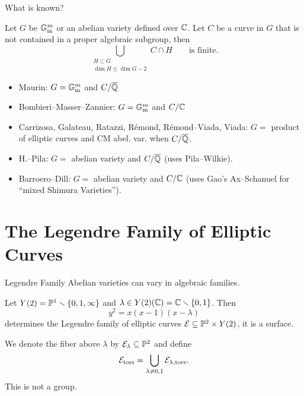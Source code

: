 \documentclass{beamer}
\begin{document}
\begin{frame}{What is known?}
  \begin{theorem}
    Let $G$ be ${\mathbb{G}}_\mathrm{m}^m$ or an abelian variety defined over
    ${\mathbb{C}}$. Let $C$ be a curve in $G$ that is not contained in a proper
    algebraic subgroup, then
    \begin{equation*}
      \bigcup_{\substack{H\subset G \\\dim H\le \dim G-2}} C\cap H
      \qquad\text{is finite.}
    \end{equation*}
  \end{theorem}
  \begin{itemize}
  \item Maurin: $G={\mathbb{G}}_{\mathrm{m}}^m$ and $C/{\overline{\mathbb{Q}}}$
  \item Bombieri--Masser--Zannier: $G={\mathbb{G}}_{\mathrm{m}}^m$ and $C/{\mathbb{C}}$
  \item Carrizosa, Galateau, Ratazzi, R\'emond,
    R\'emond--Viada,  Viada: $G=$ product of elliptic
    curves and CM abel. var. when $C/{\overline{\mathbb{Q}}}$. 
  \item H.--Pila: $G=$ abelian variety and $C/{\overline{\mathbb{Q}}}$ (uses
    Pila--Wilkie). 
  \item Barroero--Dill: $G=$ abelian variety and $C/{\mathbb{C}}$ (uses Gao's
    Ax--Schanuel for ``mixed Shimura Varieties''). 
  \end{itemize}
  
\end{frame}

\section{The Legendre Family of Elliptic Curves}

\begin{frame}{Legendre Family}
  Abelian varieties can vary in algebraic families.
  \begin{example}
    Let $Y(2) = {\mathbb{P}}^1\smallsetminus\{0,1,\infty\}$ and $\lambda\in
    Y(2)({\mathbb{C}})={\mathbb{C}}\smallsetminus\{0,1\}$. Then
    \begin{equation*}
      y^2 = x(x-1)(x-\lambda)
    \end{equation*}
    determines 
    the \alert{Legendre family of elliptic
      curves} ${\mathcal E}\subseteq {\mathbb{P}}^2\times Y(2)$, it is a surface.
    
    We denote the fiber above $\lambda$  by ${\mathcal E}_\lambda
    \subseteq{\mathbb{P}}^2$ and    
    define
    \begin{equation*}
      {\mathcal E}_{\mathrm{tors}} = \bigcup_{\lambda\not=0,1}
      {\mathcal E}_{\lambda,\mathrm{tors}}. 
    \end{equation*}
    This is \alert{not} a group.
  \end{example}
\end{frame}
\end{document}
